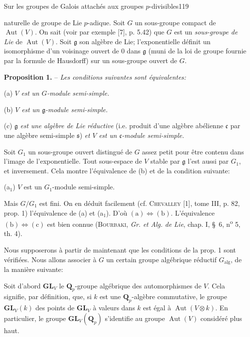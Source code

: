 \begin{center}Sur les groupes de Galois attachés aux groupes $p$-divisibles\hfill119\end{center}

naturelle de groupe de Lie $p$-adique. Soit $G$ un sous-groupe compact de $\operatorname{Aut}(V)$. On sait (voir par exemple [7], p. 5.42) que $G$ est un \textit{sous-groupe de Lie} de $\operatorname{Aut}(V)$. Soit $\mathfrak g$ son algèbre de Lie; l'exponentielle définit un isomorphisme d'un voisinage ouvert de 0 dans $\mathfrak g$ (muni de la loi de groupe fournie par la formule de Hausdorff) sur un sous-groupe ouvert de $G$.

\textbf{Proposition 1.} -- \textit{Les conditions suivantes sont équivalentes:}

(a) \textit{$V$ est un $G$-module semi-simple.}

(b) \textit{$V$ est un $\mathfrak g$-module semi-simple.}

(c) \textit{$\mathfrak g$ est une algèbre de Lie réductive} (i.e. produit d'une algèbre abélienne $\mathfrak c$ par une algèbre semi-simple $\mathfrak s$) \textit{et $V$ est un $\mathfrak c$-module semi-simple.}

Soit $G_1$ un sous-groupe ouvert distingué de $G$ assez petit pour être contenu dans l'image de l'exponentielle. Tout sous-espace de $V$ stable par $\mathfrak g$ l'est aussi par $G_1$, et inversement. Cela montre l'équivalence de (b) et de la condition suivante:

(a$_1$) $V$ est un $G_1$-module semi-simple.

Mais $G/G_1$ est fini. On en déduit facilement (cf. \textsc{Chevalley} [1], tome III, p. 82, prop. 1) l'équivalence de (a) et (a$_1$). D'où $(\mathrm a)\Leftrightarrow(\mathrm b)$. L'équivalence $(\mathrm b)\Leftrightarrow(\mathrm c)$ est bien connue (\textsc{Bourbaki}, \textit{Gr. et Alg. de Lie}, chap. I, \S\ 6, n\textsuperscript{o} 5, th. 4).

Nous supposerons à partir de maintenant que les conditions de la prop. 1 sont vérifiées. Nous allons associer à $G$ un certain groupe algébrique réductif $G_{\mathrm{alg}}$, de la manière suivante:

Soit d'abord $\mathbf{GL}_V$ le $\mathbf Q_p$-groupe algébrique des automorphismes de $V$. Cela signifie, par définition, que, si $k$ est une $\mathbf Q_p$-algèbre commutative, le groupe $\mathbf{GL}_V(k)$ des points de $\mathbf{GL}_V$ à valeurs dans $k$ est égal à $\operatorname{Aut}(V\otimes k)$. En particulier, le groupe $\mathbf{GL}_V(\mathbf Q_p)$ s'identifie au groupe $\operatorname{Aut}(V)$ considéré plus haut.

